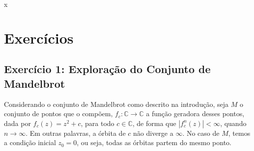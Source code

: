 x\section{Exercícios}

\subsection{Exercício 1: Exploração do Conjunto de Mandelbrot}

Considerando o conjunto de Mandelbrot como descrito na introdução, seja \( M \) o
conjunto de pontos que o compõem, \( f_c : \mathbb{C} \to \mathbb{C} \) a função geradora desses pontos, dada por \( f_c (z) = z^2 + c \), para todo
\( c \in \mathbb{C} \), de forma que \( |f_c^n (z)| < \infty \), quando \( n \to \infty \). Em outras palavras, a órbita de \( c \) não diverge a \( \infty \). No caso de
\( M \), temos a condição inicial \( z_0 = 0 \), ou seja, todas as órbitas partem do mesmo ponto.

